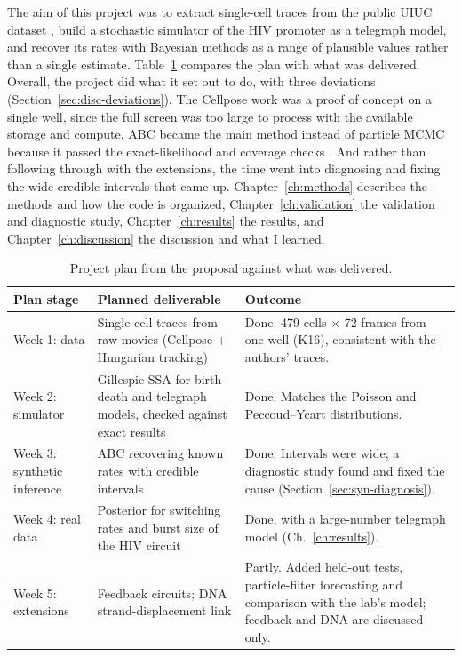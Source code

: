 The aim of this project was to extract single-cell traces from the public UIUC dataset \cite{idb_dataset}, build a stochastic simulator of the HIV promoter as a telegraph model, and recover its rates with Bayesian methods as a range of plausible values rather than a single estimate. Table~\ref{tab:plan} compares the plan with what was delivered. Overall, the project did what it set out to do, with three deviations (Section~\ref{sec:disc-deviations}). The Cellpose work \cite{pachitariu2025} was a proof of concept on a single well, since the full screen was too large to process with the available storage and compute. ABC became the main method instead of particle MCMC because it passed the exact-likelihood and coverage checks \cite{prangle2014}. And rather than following through with the extensions, the time went into diagnosing and fixing the wide credible intervals that came up. Chapter~\ref{ch:methods} describes the methods and how the code is organized, Chapter~\ref{ch:validation} the validation and diagnostic study, Chapter~\ref{ch:results} the results, and Chapter~\ref{ch:discussion} the discussion and what I learned.

\begin{table}[htbp]
\centering
\small
\begin{tabular}{p{2.6cm}p{5.0cm}p{6.8cm}}
\toprule
Plan stage & Planned deliverable & Outcome \\
\midrule
Week 1: data & Single-cell traces from raw movies (Cellpose + Hungarian tracking) & Done. 479 cells $\times$ 72 frames from one well (K16), consistent with the authors' traces. \\
Week 2: simulator & Gillespie SSA for birth--death and telegraph models, checked against exact results & Done. Matches the Poisson and Peccoud--Ycart distributions. \\
Week 3: synthetic inference & ABC recovering known rates with credible intervals & Done. Intervals were wide; a diagnostic study found and fixed the cause (Section~\ref{sec:syn-diagnosis}). \\
Week 4: real data & Posterior for switching rates and burst size of the HIV circuit & Done, with a large-number telegraph model (Ch.~\ref{ch:results}). \\
Week 5: extensions & Feedback circuits; DNA strand-displacement link & Partly. Added held-out tests, particle-filter forecasting and comparison with the lab's model; feedback and DNA are discussed only. \\
\bottomrule
\end{tabular}
\caption{Project plan from the proposal against what was delivered.}
\label{tab:plan}
\end{table}
